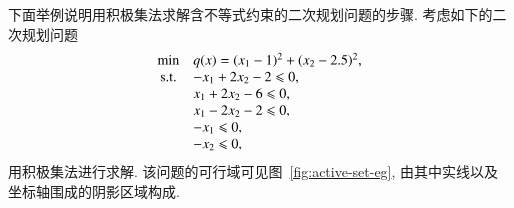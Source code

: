 \begin{exam}\label{eg:qp-active-set-algo}
下面举例说明用积极集法求解含不等式约束的二次规划问题的步骤. 考虑如下的二次规划问题
\begin{equation*}
\begin{array}{cl}
\min & q({x}) = (x_1 - 1)^2 + (x_2 - 2.5)^2, \\
{\rm s.t.} & -x_1 + 2x_2 - 2 \leqslant 0, \\
& x_1 + 2x_2 - 6 \leqslant 0, \\
& x_1 - 2x_2 - 2 \leqslant 0, \\
& -x_1 \leqslant 0, \\
& -x_2 \leqslant 0,
\end{array}
\end{equation*}
用积极集法进行求解. 该问题的可行域可见图~\ref{fig:active-set-eg}, 由其中实线以及坐标轴围成的阴影区域构成.





\end{exam}

